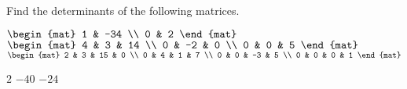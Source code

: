
\begin{Exercise}[
name={},
title={}, 
difficulty=0,
origin={\cite{KK}}]
Find the determinants of the following matrices.
\begin{multicols}{2}
\Question $\begin{mat}
1 & -34 \\
0 & 2 
\end{mat}$
\Question $\begin{mat}
4 & 3 & 14 \\
0 & -2 & 0 \\
0 & 0 & 5 
\end{mat}$
\Question $\begin{mat}
2 & 3 & 15 & 0 \\
0 & 4 & 1 & 7 \\
0 & 0 & -3 & 5 \\
0 & 0 & 0 & 1 
\end{mat}$
\EndCurrentQuestion
\end{multicols}

\end{Exercise}
\begin{Answer}
\Question $2$
\Question $-40$
\Question $-24$
\end{Answer}
